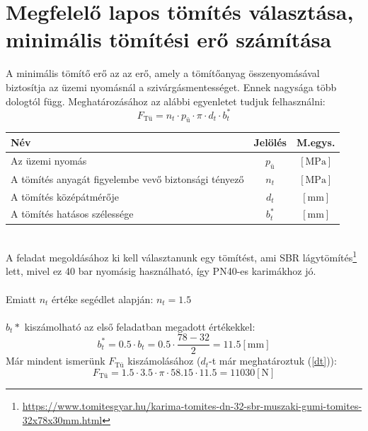 \documentclass[10pt, a4paper]{article}
\newcommand{\n}{\mathrm{\left[N\right]}}
\newcommand{\mpa}{\mathrm{\left[MPa\right]}}
\newcommand{\mm}{\mathrm{\left[mm\right]}}
\begin{document}
	\section{Megfelelő lapos tömítés választása, minimális tömítési erő számítása}
	A minimális tömítő erő az az erő, amely a tömítőanyag összenyomásával biztosítja az üzemi nyomásnál a szivárgásmentességet. Ennek nagysága több dologtól függ. Meghatározásához az alábbi egyenletet tudjuk felhasználni:
	\begin{equation}
		F_\text{Tü} = n_t \cdot p_\text{ü} \cdot \pi \cdot d_t \cdot b_t^* \tag{3}
	\end{equation}
	\vspace{-15pt}
	\renewcommand{\arraystretch}{1.4}
			\begin{table}[!h]
				\centering
				\begin{tabular}{l|c|c}
					\textbf{Név}                              & \textbf{Jelölés} & \textbf{M.egys.} \\ \hline
					Az üzemi nyomás                     & $p_\text{ü}$                & $\mpa$          \\
					A tömítés anyagát figyelembe vevő biztonsági tényező           & $n_t$                & $\mpa$			\\
					A tömítés középátmérője               & $d_t$                & $\mm$     \\
					A tömítés hatásos szélessége                 & $b_t^*$                & $\mm$           
				\end{tabular}
			\end{table}
		\renewcommand{\arraystretch}{1}\\
	A feladat megoldásához ki kell választanunk egy tömítést, ami SBR lágytömítés\footnote{\url{https://www.tomitesgyar.hu/karima-tomites-dn-32-sbr-muszaki-gumi-tomites-32x78x30mm.html}} lett, mivel ez 40 bar nyomásig használható, így PN40-es karimákhoz jó.\\\\
	Emiatt $n_t$ értéke segédlet alapján: $n_t = 1.5$\\\\
	$b_t*$ kiszámolható az első feladatban megadott értékekkel:
	\begin{equation}
		b_t^* = 0.5 \cdot b_t = 0.5 \cdot \dfrac{78 - 32}{2} = 11.5 \mm\tag{3.1}
	\end{equation}
	Már mindent ismerünk $F_\text{Tü}$ kiszámolásához ($d_t$-t már meghatároztuk (\ref{dt})):
	\begin{equation}
		F_\text{Tü} = 1.5 \cdot 3.5 \cdot \pi \cdot 58.15 \cdot 11.5 = 11030\n\tag{3.2}
	\end{equation}
	\newpage
\end{document}
